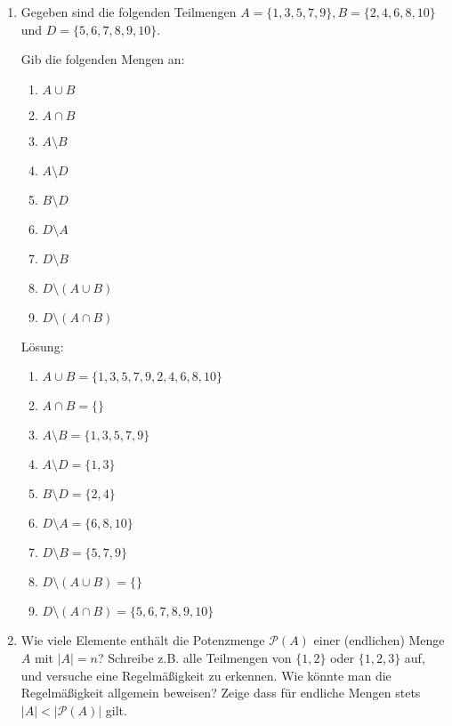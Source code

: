 \documentclass[main.tex]{subfiles}
\begin{document}
\begin{enumerate}
	\item Gegeben sind die folgenden Teilmengen \(A = \{ 1, 3, 5, 7, 9 \}, B = \{2, 4, 6, 8, 10 \} \) und
	      \(D = \{ 5,6,7,8,9,10\} \).

	      Gib die folgenden Mengen an:
	      \begin{multicols}{3}
		      \begin{enumerate}
			      \item \(A \cup B \)
			      \item \(A \cap B \)
			      \item \(A \setminus B \)
			      \item \(A \setminus D \)
			      \item \(B \setminus D \)
			      \item \(D \setminus A \)
			      \item \(D \setminus B \)
			      \item \(D \setminus(A \cup B) \)
			      \item \(D \setminus(A \cap B) \)
		      \end{enumerate}
	      \end{multicols}

	      Lösung:
	      \begin{multicols}{2}
		      \begin{enumerate}
			      \item \(A \cup B = \{ 1,3,5,7,9,2,4,6,8,10 \} \)
			      \item \(A \cap B = \{ \}\)
			      \item \(A \setminus B = \{ 1,3,5,7,9 \} \)
			      \item \(A \setminus D = \{ 1, 3 \}\)
			      \item \(B \setminus D = \{ 2, 4 \}\)
			      \item \(D \setminus A = \{ 6, 8, 10 \}\)
			      \item \(D \setminus B = \{ 5, 7, 9 \}\)
			      \item \(D \setminus(A \cup B) = \{ \} \)
			      \item \(D \setminus(A \cap B) = \{ 5,6,7,8,9,10 \} \)
		      \end{enumerate}
	      \end{multicols}
	\item Wie viele Elemente enthält die Potenzmenge \( \mathcal{P}(A) \) einer (endlichen)
	      Menge \(A \) mit \( |A| = n \)? Schreibe z.B. alle Teilmengen von \( \{1,2\} \) oder
	      \( \{1,2,3\} \) auf, und versuche eine Regelmäßigkeit zu erkennen.
	      Wie könnte man die Regelmäßigkeit allgemein beweisen?
	      Zeige dass für endliche Mengen stets \( |A| < |\mathcal{P}(A)| \) gilt.


\end{enumerate}
\end{document}
